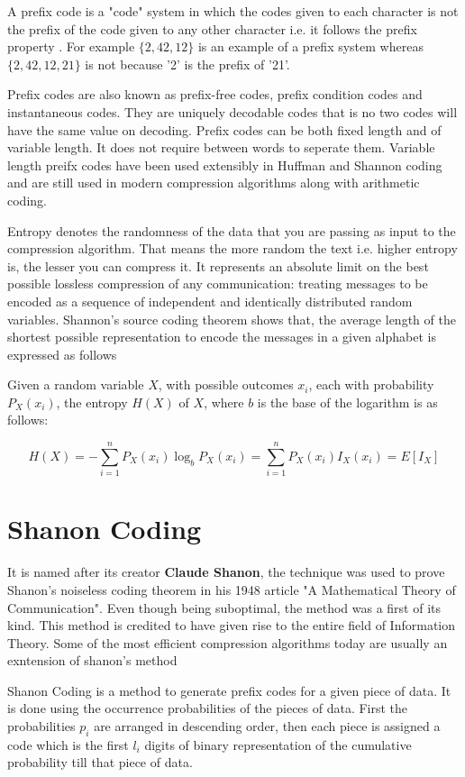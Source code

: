 \documentclass{article}
\begin{document}
A prefix code is a "code" system in which the codes given to each character is not the prefix of the code given to any other character i.e. it follows the prefix property \cite{berstel1985theory}. For example $\{2,42,12\}$ is an example of a prefix system whereas $\{2,42,12,21\}$ is not because '2' is the prefix of '21'.

Prefix codes are also known as prefix-free codes, prefix condition codes and instantaneous codes. They are uniquely decodable codes that is no two codes will have the same value on decoding. Prefix codes can be both fixed length and of variable length. It does not require between words to seperate them. Variable length preifx codes have been used extensibly in Huffman and Shannon coding and are still used in modern compression algorithms along with arithmetic coding.

Entropy denotes the randomness of the data that you are passing as input to the compression algorithm. That means the more random the text i.e. higher entropy is, the lesser you can compress it. It represents an absolute limit on the best possible lossless compression of any communication: treating messages to be encoded as a sequence of independent and identically distributed random variables. Shannon's source coding theorem shows that, the average length of the shortest possible representation to encode the messages in a given alphabet is expressed as follows

Given a random variable $X$, with possible outcomes $x_{i}$, each with probability $P_{X}(x_{i})$, the entropy $H(X)$ of $X$, where $b$ is the base of the logarithm is as follows:

$$H(X) = - \sum_{i=1}^{n} P_X(x_{i}) \log_{b} P_X(x_{i}) = \sum_{i=1}^{n} P_X(x_{i})I_X(x_{i}) = E[I_X] $$


\section {Shanon Coding}

It is named after its creator \textbf{Claude Shanon}, the technique was used to prove Shanon's noiseless coding theorem in his 1948 article "A Mathematical Theory of Communication"\cite{shannon1948mathematical}. Even though being suboptimal, the method was a first of its kind. This method is credited to have given rise to the entire field of Information Theory. Some of the most efficient compression algorithms today are usually an exntension of shanon's method

Shanon Coding is a method to generate prefix codes for a given piece of data. It is done using the occurrence probabilities of the pieces of data. First the probabilities $p_{i}$ are arranged in descending order, then each piece is assigned a code which is the first $l_{i}$ digits of binary representation of the cumulative probability till that piece of data. 
\end{document}
